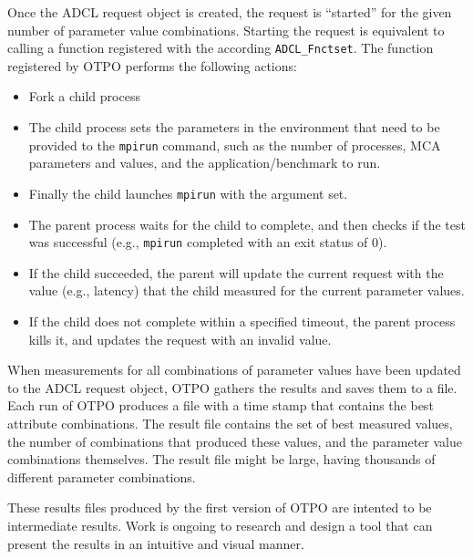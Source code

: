 Once the ADCL request object is created, the request is ``started'' for the given number of parameter value combinations.
Starting the request is equivalent to calling a function registered with the according {\tt ADCL\_\-Fnctset}. The function registered by OTPO performs the following actions:
\begin{itemize}
\item Fork a child process
\item The child process sets the parameters in the environment that need to be provided to the {\tt mpirun}
  command, such as the number of processes, MCA parameters and values, and the application/benchmark to run.
\item Finally the child launches {\tt mpirun} with the argument
  set.
\item The parent process waits for the child to complete, and then checks if the test was successful (e.g., {\tt mpirun} completed with an exit status of 0).
\item If the child succeeded, the parent will update the current request with
  the value (e.g., latency) that the child measured for the current parameter values.
\item If the child does not complete within a specified timeout, the parent process kills it, and
  updates the request with an invalid value.
\end{itemize}

When measurements for all combinations of parameter values have been updated to the ADCL request object, 
OTPO gathers the results and saves them to a file. Each run of OTPO produces a
file with a time stamp that contains the best attribute combinations. The
result file contains the set of best measured values, the number of combinations that
produced these values, and the parameter value combinations themselves. The result file might be large,
having thousands of different parameter combinations. 

These results files produced by the first version of OTPO are intented
to be intermediate results.  Work is ongoing to research and design a
tool that can present the results in an intuitive and visual manner.

